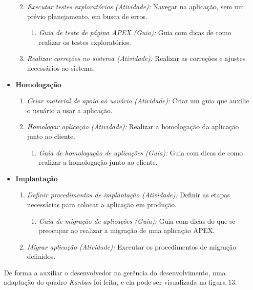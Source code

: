 \begin{itemize}
\begin{enumerate}
\begin{enumerate}
\end{enumerate}
\item \textit{Executar testes exploratórios (Atividade):} Navegar na aplicação, sem um prévio planejamento, em busca de erros.
\begin{enumerate}
\item \textit{Guia de teste de página APEX (Guia):} Guia com dicas de como realizar os testes exploratórios.
\end{enumerate}
\item \textit{Realizar correções no sistema (Atividade):} Realizar as correções e ajustes necessários ao sistema.
\end{enumerate}
\item \textbf{Homologação}
\begin{enumerate}
\item \textit{Criar material de apoio ao usuário (Atividade):} Criar um guia que auxilie o usuário a usar a aplicação.
\item \textit{Homologar aplicação (Atividade):} Realizar a homologação da aplicação junto ao cliente.
\begin{enumerate}
\item \textit{Guia de homologação de aplicações (Guia):} Guia com dicas de como realizar a homologação junto ao cliente.
\end{enumerate}
\end{enumerate}
\item \textbf{Implantação}
\begin{enumerate}
\item \textit{Definir procedimentos de implantação (Atividade):} Definir as etapas necessárias para colocar a aplicação em produção.
\begin{enumerate}
\item \textit{Guia de migração de aplicações (Guia):} Guia com dicas do que se preocupar ao realizar a migração de uma aplicação APEX.
\end{enumerate}
\item \textit{Migrar aplicação (Atividade):} Executar os procedimentos de migração definidos.
\end{enumerate}
\end{itemize}
De forma a auxiliar o desenvolvedor na gerência do desenvolvimento, uma adaptação do quadro \textit{Kanban} foi feita, e ela pode ser visualizada na figura 13. \clearpage

